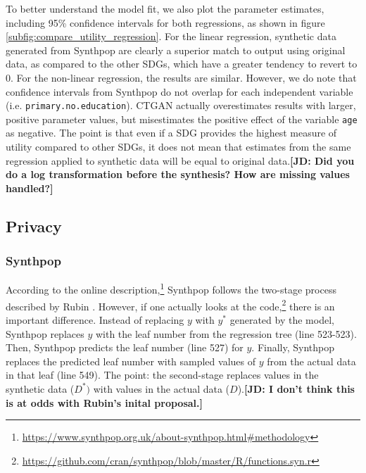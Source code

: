 \documentclass[runningheads]{llncs}
\newcommand{\jd}[1]{\scriptsize {\bf \color{red}[JD: #1]}\normalsize}
\begin{document}
To better understand the model fit, we also plot the parameter estimates, including 95\% confidence intervals for both regressions, as shown in figure \ref{subfig:compare_utility_regression}.  For the linear regression, synthetic data generated from Synthpop are clearly a superior match to output using original data, as compared to the other SDGs, which have a greater tendency to revert to 0.  For the non-linear regression, the results are similar.  However, we do note that confidence intervals from Synthpop do not overlap for each independent variable (i.e. \texttt{primary.no.education}).  CTGAN actually overestimates results with larger, positive parameter values, but misestimates the positive effect of the variable \texttt{age} as negative.  The point is that even if a SDG provides the highest measure of utility compared to other SDGs, it does not mean that estimates from the same regression applied to synthetic data will be equal to original data.\jd{Did you do a log transformation before the synthesis? How are missing values handled?}

\subsection{Privacy}

\subsubsection{Synthpop} 

According to the online description,\footnote{\url{https://www.synthpop.org.uk/about-synthpop.html\#methodology}} Synthpop follows the two-stage process described by Rubin \citep{rubin1993statistical}.  However, if one actually looks at the code,\footnote{\url{https://github.com/cran/synthpop/blob/master/R/functions.syn.r}} there is an important difference.  Instead of replacing $y$ with $y^*$ generated by the model, Synthpop replaces $y$ with the leaf number from the regression tree (line 523-523).  Then, Synthpop predicts the leaf number (line 527) for $y$.  Finally, Synthpop replaces the predicted leaf number with sampled values of $y$ from the actual data in that leaf (line 549).  The point: the second-stage replaces values in the synthetic data ($D^*)$ with values in the actual data ($D$).\jd{I don't think this is at odds with Rubin's inital proposal.}  
\end{document}
